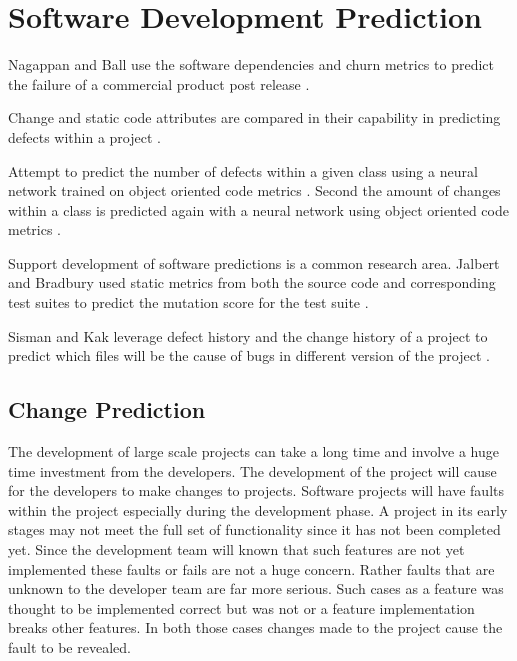 \section{Software Development Prediction}


Nagappan and Ball use the software dependencies and churn metrics to predict the failure of a commercial product post release \cite{Nagappan2007}.

Change and static code attributes are compared in their capability in predicting defects within a project \cite{Moser2008}.

Attempt to predict the number of defects within a given class using a neural network trained on object oriented code metrics \cite{Thwin2005}. Second the amount of changes within a class is predicted again with a neural network using object oriented code metrics \cite{Thwin2005}.

Support development of software predictions is a common research area. Jalbert and Bradbury used static metrics from both the source code and corresponding test suites to predict the mutation score for the test suite \cite{Jalbert2012}.

Sisman and Kak leverage defect history and the change history of a project to predict which files will be the cause of bugs in different version of the project \cite{Sisman2012}.

\subsection{Change Prediction}

The development of large scale projects can take a long time and involve a huge time investment from the developers. The development of the project will cause for the developers to make changes to projects. Software projects will have faults within the project especially during the development phase. A project in its early stages may not meet the full set of functionality since it has not been completed yet. Since the development team will known that such features are not yet implemented these faults or fails are not a huge concern. Rather faults that are unknown to the developer team are far more serious. Such cases as a feature was thought to be implemented correct but was not or a feature implementation breaks other features. In both those cases changes made to the project cause the fault to be revealed.

